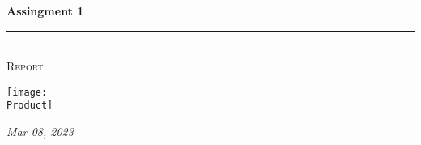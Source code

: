 \documentclass[a4paper,11pt,twoside]{article}
\newcommand{\HRule}{\rule{\linewidth}{0.3mm}}                       %
\newcommand{\Version}{1.0}
\newcommand{\Logo}{logo.jpg}
\newcommand{\Product}{cover.jpg}
\newcommand{\Title}{Assingment 1}
\newcommand{\Subtitle}{Report}
\newcommand{\DocumentDate}{Mar 08, 2023}
\begin{document}
\begin{titlepage}
    \textcolor{ceiiablue}{\textbf{\Huge \Title}}\\                  %
    \HRule \\[0.2cm]
    \textsc{\Large \Subtitle}                                       %
    \vfill
    \begin{center}
        \texttt{[image: \\Product]}
    \end{center}

    {\raggedleft\vfill\itshape{
        \DocumentDate}
    }
\end{titlepage}

\clearpage

\tableofcontents
\newpage




%

\clearpage
% 
% 
\end{document}
